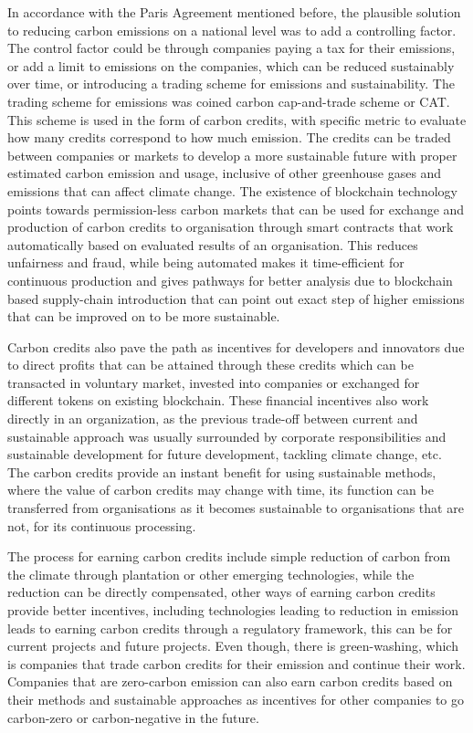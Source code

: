 \documentclass[11pt, a4paper]{article}
\begin{document}
In accordance with the Paris Agreement mentioned before, the plausible solution to reducing carbon emissions on a national level was to add a controlling factor. The control factor could be through companies paying a tax for their emissions, or add a limit to emissions on the companies, which can be reduced sustainably over time, or introducing a trading scheme for emissions and sustainability. The trading scheme for emissions was coined carbon cap-and-trade scheme or CAT. \cite{zhao_when_2020} This scheme is used in the form of carbon credits, with specific metric to evaluate how many credits correspond to how much emission. The credits can be traded between companies or markets to develop a more sustainable future with proper estimated carbon emission and usage, inclusive of other greenhouse gases and emissions that can affect climate change.  
The existence of blockchain technology points towards permission-less carbon markets that can be used for exchange and production of carbon credits to organisation through smart contracts that work automatically based on evaluated results of an organisation. \cite{shakhbulatov_blockchain_2019} This reduces unfairness and fraud, while being automated makes it time-efficient for continuous production and gives pathways for better analysis due to blockchain based supply-chain introduction that can point out exact step of higher emissions that can be improved on to be more sustainable. \cite{jackson_networked_2018}

Carbon credits also pave the path as incentives for developers and innovators due to direct profits that can be attained through these credits which can be transacted in voluntary market, invested into companies or exchanged for different tokens on existing blockchain. \cite{ashley_establishing_2018}  These financial incentives also work directly in an organization, as the previous trade-off between current and sustainable approach was usually surrounded by corporate responsibilities and sustainable development for future development, tackling climate change, etc. The carbon credits provide an instant benefit for using sustainable methods, where the value of carbon credits may change with time, its function can be transferred from organisations as it becomes sustainable to organisations that are not, for its continuous processing. \cite{ashley_establishing_2018}

The process for earning carbon credits include simple reduction of carbon from the climate through plantation or other emerging technologies, while the reduction can be directly compensated, other ways of earning carbon credits provide better incentives, including technologies leading to reduction in emission leads to earning carbon credits through a regulatory framework, this can be for current projects and future projects. Even though, there is green-washing, which is companies that trade carbon credits for their emission and continue their work. Companies that are zero-carbon emission can also earn carbon credits based on their methods and sustainable approaches as incentives for other companies to go carbon-zero or carbon-negative in the future. \cite{reynolds_zero-carbon_2021}
\end{document}
